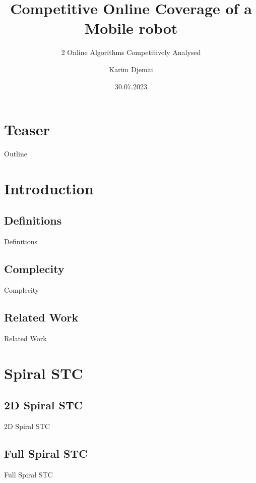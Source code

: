 \documentclass{beamer}
\title{Competitive Online Coverage of a Mobile robot}
\subtitle{2 Online Algorithms Competitively Analysed}
\author{Karim Djemai}
\institute{Universität Hamburg}
\date{30.07.2023}
\begin{document}

\begin{frame}
    \maketitle %
\end{frame}

\section{Teaser}

\begin{frame}{Outline}
    \tableofcontents[hideallsubsections]
\end{frame}

\section{Introduction}
\subsection{Definitions}
\begin{frame}{Definitions}
\end{frame}
\subsection{Complecity}
\begin{frame}{Complecity}
\end{frame}
\subsection{Related Work}
\begin{frame}{Related Work}
\end{frame}

\section{Spiral STC}
\subsection{2D Spiral STC}
\begin{frame}{2D Spiral STC}
\end{frame}
\subsection{Full Spiral STC}
\begin{frame}{Full Spiral STC}
\end{frame}
\end{document}
